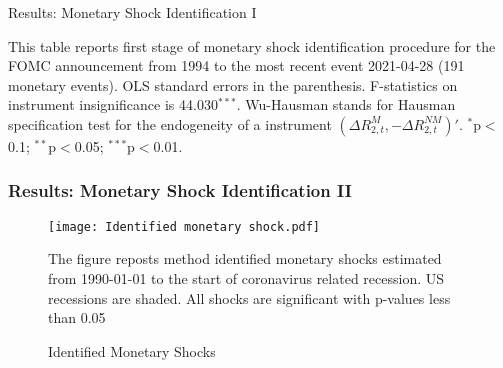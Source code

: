 \documentclass[11pt,pdf,aspectratio=129]{beamer}
\begin{document}
\begin{frame}{Results: Monetary Shock Identification I}
\begin{table}[ht]
\begin{threeparttable}
\begin{tablenotes}[flushleft]
    \item\tiny{}This table reports first stage of  monetary shock identification procedure for the FOMC announcement from 1994 to the most recent event 2021-04-28 (191 monetary events). OLS standard errors in the parenthesis. F-statistics on instrument insignificance is 44.030$^{***}$. Wu-Hausman stands for Hausman specification test for the endogeneity of a instrument $\left(\Delta R_{2,t}^{\textit{M}},-\Delta R_{2,t}^{\textit{NM}}\right)'$. $^{*}$p$<$0.1; $^{**}$p$<$0.05; $^{***}$p$<$0.01. 
      \end{tablenotes}
    \end{threeparttable}
      \end{table} 
      
\end{frame}

\begin{frame}\frametitle{Results: Monetary Shock Identification II}
    \begin{figure}[!ht]\centering
        \begin{minipage}{0.75\textwidth}
            \caption{Identified Monetary Shocks}
            \label{fig:BRW Shock}
            \texttt{[image: Identified monetary shock.pdf]}
            {\begin{flushleft}\tiny The figure reposts  method identified monetary shocks estimated from 1990-01-01 to the start of coronavirus related recession. US recessions are shaded. All shocks are significant with p-values less than 0.05\end{flushleft}}
            \end{minipage}
    \end{figure}


\end{frame}
\end{document}

